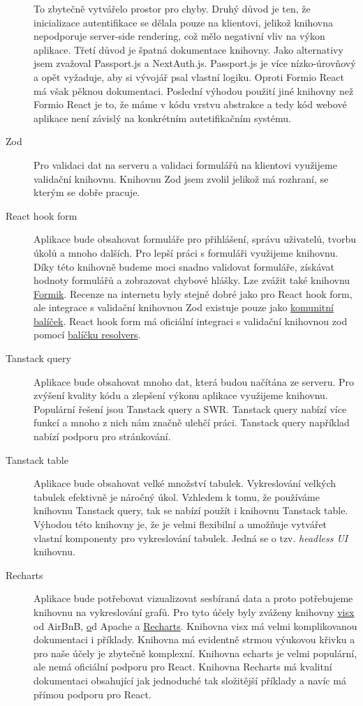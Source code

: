 \begin{description}
    To zbytečně vytvářelo prostor pro chyby.
    Druhý důvod je ten, že inicializace autentifikace se dělala pouze na klientovi, jelikož knihovna nepodporuje server-side rendering, což mělo negativní vliv na výkon aplikace.
    Třetí důvod je špatná dokumentace knihovny.
    Jako alternativy jsem zvažoval Passport.js a NextAuth.js.
    Passport.js je více nízko-úrovňový a opět vyžaduje, aby si vývojář psal vlastní logiku.
    Oproti Formio React má však pěknou dokumentaci.
    Poslední výhodou použití jiné knihovny než Formio React je to, že máme v kódu vrstvu abstrakce a tedy kód webové aplikace není závislý na konkrétním autetifikačním systému.
    \item[Zod]
    Pro validaci dat na serveru a validaci formulářů na klientovi využijeme validační knihovnu.
    Knihovnu Zod jsem zvolil jelikož má rozhraní, se kterým se dobře pracuje.
    \item[React hook form]
    Aplikace bude obsahovat formuláře pro přihlášení, správu uživatelů, tvorbu úkolů a mnoho dalších.
    Pro lepší práci s formuláři využijeme knihovnu.
    Díky této knihovně budeme moci snadno validovat formuláře, získávat hodnoty formulářů a zobrazovat chybové hlášky.
    Lze zvážit také knihovnu \href{https://formik.org}{Formik}.
    Recenze na internetu byly stejně dobré jako pro React hook form, ale integrace s validační knihovnou Zod existuje pouze jako \href{https://github.com/robertLichtnow/zod-formik-adapter}{komunitní balíček}.
    React hook form má oficiální integraci s validační knihovnou zod pomocí \href{https://github.com/react-hook-form/resolvers}{balíčku resolvers}.
    \item[Tanstack query]
    Aplikace bude obsahovat mnoho dat, která budou načítána ze serveru.
    Pro zvýšení kvality kódu a zlepšení výkonu aplikace využijeme knihovnu.
    Populární řešení jsou Tanstack query a SWR\@.
    Tanstack query nabízí více funkcí a mnoho z nich nám značně ulehčí práci.
    Tanstack query například nabízí podporu pro stránkování.
    \item[Tanstack table]
    Aplikace bude obsahovat velké množství tabulek.
    Vykreslování velkých tabulek efektivně je náročný úkol.
    Vzhledem k tomu, že používáme knihovnu Tanstack query, tak se nabízí použít i knihovnu Tanstack table.
    Výhodou této knihovny je, že je velmi flexibilní a umožňuje vytvářet vlastní komponenty pro vykreslování tabulek.
    Jedná se o tzv. \textit{headless UI} knihovnu.
    \item[Recharts]
    Aplikace bude potřebovat vizualizovat sesbíraná data a proto potřebujeme knihovnu na vykreslování grafů.
    Pro tyto účely byly zváženy knihovny \href{https://github.com/airbnb/visx}{visx} od AirBnB, \href{https://github.com/apache/echarts} od Apache a \href{https://github.com/recharts/recharts}{Recharts}.
    Knihovna visx má velmi komplikovanou dokumentaci i příklady.
    Knihovna má evidentně strmou výukovou křivku a pro naše účely je zbytečně komplexní.
    Knihovna echarts je velmi populární, ale nemá oficiální podporu pro React.
    Knihovna Recharts má kvalitní dokumentaci obsahující jak jednoduché tak složitější příklady a navíc má přímou podporu pro React.
\end{description}

